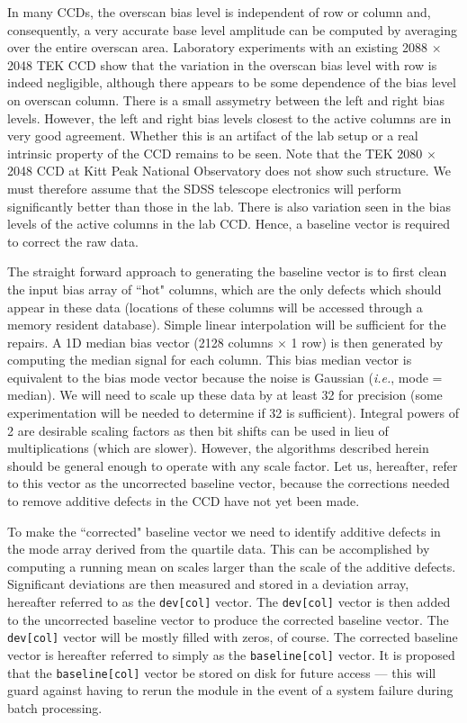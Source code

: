 In many CCDs, the overscan bias level is independent
of row or column and, consequently, a very accurate
base level amplitude can be computed by averaging over
the entire overscan area. Laboratory experiments with an existing
2088 $\times$ 2048 TEK CCD show that the variation in the
overscan bias level with row is indeed negligible, although
there appears to be some dependence of the bias level
on overscan column. There is a small assymetry between the
left and right bias levels. However, the left and right bias levels
closest to the active columns are in very good agreement.
Whether this is an artifact of the lab setup or a real
intrinsic property of the CCD remains to be seen. Note that the TEK 
2080 $\times$ 2048 CCD
at Kitt Peak National Observatory does not show such structure. 
We must therefore assume
that the SDSS telescope electronics will perform significantly better
than those in the lab. 
There is also variation seen in the bias levels of the active columns
in the lab CCD. Hence, a baseline vector is required to correct
the raw data.  

The straight forward approach to generating the baseline
vector is to first clean the input bias array of ``hot" columns, which
are the only defects which should appear in these data (locations
of these columns will be accessed through a memory resident database).
Simple linear interpolation will be sufficient for the repairs.
A 1D median bias vector (2128 columns $\times$ 1 row) is then generated
by computing the median signal for each column. This bias median vector is
equivalent to the bias mode vector because the noise
is Gaussian ({\it i.e.}, mode = median). We will need to scale
up these data by at least 32 for precision
(some experimentation will be needed to determine if 32 is sufficient).
Integral powers of 2 are desirable scaling factors as then bit shifts can
be used in lieu of multiplications (which are slower). However, the
algorithms described herein should be general enough to operate with
any scale factor. Let us, hereafter, refer to this vector as the
uncorrected baseline vector, because the corrections needed
to remove additive defects in the CCD have not yet been made.

To make the ``corrected" baseline vector we need to identify additive
defects in the mode array derived from the quartile data. This can
be accomplished by computing a running mean on scales larger than the
scale of the additive defects. Significant deviations are
then measured and stored in a deviation array, hereafter referred to
as the {\tt dev[col]} vector. The {\tt dev[col]} vector is then
added to the uncorrected baseline vector to produce the corrected baseline
vector. The {\tt dev[col]} vector will be mostly filled with zeros, of course. 
The corrected baseline vector is hereafter referred to
simply as the {\tt baseline[col]} vector.
It is proposed that the {\tt baseline[col]} vector be stored on
disk for future access --- this will guard against having to rerun
the \icfrm module in the event of a system failure during
\cfrm batch processing.

